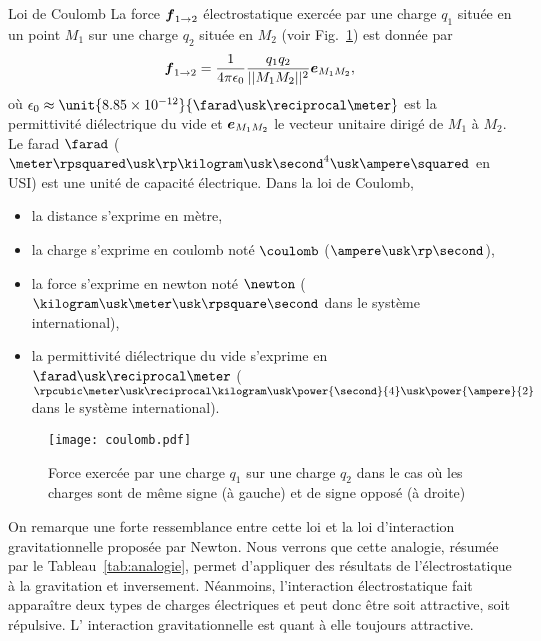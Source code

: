 \begin{defn}{Loi de Coulomb}
	La force $\vecf_{1 \rightarrow 2}$ électrostatique
	exercée par une charge $q_1$ située en un point $M_1$ sur une 
	charge $q_2$ située en $M_2$ (voir Fig.~\ref{fig:coulomb}) est donnée par
	\begin{equation}
		\label{eq:loi_coulomb}
		\vecf_{1 \rightarrow 2} = \dfrac{1}{4\pi\epsilon_0}
	                                \dfrac{q_1 q_2}{||M_1M_2||^2}
					\mitbf{e}_{M_1M_2},
	\end{equation}
	où $\epsilon_0 \approx \unit{8.85 \times 10^{-12}}
	{\farad \usk \reciprocal \meter}$ 
	est la permittivité diélectrique
	du vide et $\mitbf{e}_{M_1M_2}$ le vecteur unitaire dirigé de $M_1$ à
	$M_2$. Le farad $\farad$ ($\meter \rpsquared \usk \rp \kilogram
	\usk \second^4 \usk \ampere \squared$ en USI)
	est une unité de capacité électrique.
	Dans la loi de Coulomb,
	\begin{itemize}
		\item la distance s'exprime en mètre,
		\item la charge s'exprime en coulomb noté $\coulomb$
		($\ampere \usk \rp \second$),
		\item la force s'exprime en newton noté $\newton$ 
		  ($\kilogram \usk \meter
		  \usk \rpsquare \second$ dans le système international),
		\item la permittivité diélectrique du vide s'exprime en 
		  $\farad \usk \reciprocal \meter$ 
		  ($\rpcubic \meter \usk \reciprocal \kilogram \usk 
		  \power{\second}{4} \usk \power{\ampere}{2}$ dans le système
		  international).
	\end{itemize}

\end{defn}

\begin{figure}[h!]
	\centering
	\texttt{[image: coulomb.pdf]}
	\caption{Force exercée par une charge $q_1$ sur une charge $q_2$ dans
	         le cas où les charges sont de même signe (à gauche) et de 
	 	signe opposé (à droite)}%
	\label{fig:coulomb}
\end{figure}


On remarque une forte ressemblance entre cette loi et la loi d'interaction gravitationnelle
proposée par Newton. Nous verrons que cette analogie, résumée par le Tableau~\ref{tab:analogie},
permet d'appliquer des résultats de l'électrostatique à la gravitation et inversement.
Néanmoins, l'interaction électrostatique fait apparaître deux types de charges
électriques et peut donc être soit attractive, soit répulsive. L'
interaction gravitationnelle est quant à elle toujours attractive.

